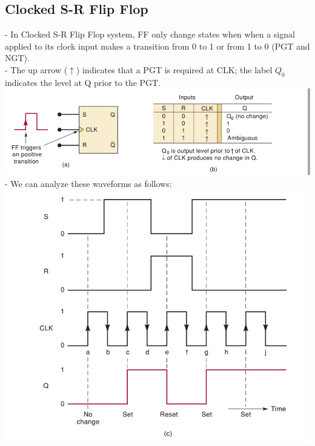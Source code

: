 \documentclass[12pt]{article}
\begin{document}
\subsection{Clocked S-R Flip Flop}
- In Clocked S-R Flip Flop system, FF only change states when when a signal applied to its clock input makes a transition from 0 to 1 or from 1 to 0 (PGT and NGT). \\
- The up arrow ($\uparrow$) indicates that a PGT is required at CLK; the label $Q_{0}$ indicates the level at Q prior to the PGT. \\
\includegraphics[scale = 0.7]{hinh10}
\bigbreak
- We can analyze these waveforms as follows: \\
\includegraphics[scale = 0.7]{hinh9}
\bigbreak
\end{document}
